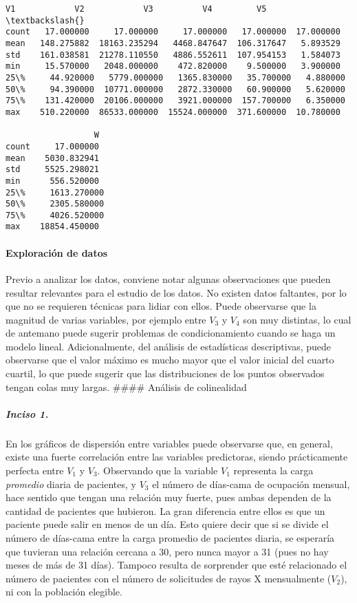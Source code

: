 \documentclass[11pt]{article}
\begin{document}
    
    
    \begin{Verbatim}[commandchars=\\\{\}]
               V1            V2            V3          V4         V5  \textbackslash{}
count   17.000000     17.000000     17.000000   17.000000  17.000000   
mean   148.275882  18163.235294   4468.847647  106.317647   5.893529   
std    161.038581  21278.110550   4886.552611  107.954153   1.584073   
min     15.570000   2048.000000    472.820000    9.500000   3.900000   
25\%     44.920000   5779.000000   1365.830000   35.700000   4.880000   
50\%     94.390000  10771.000000   2872.330000   60.900000   5.620000   
75\%    131.420000  20106.000000   3921.000000  157.700000   6.350000   
max    510.220000  86533.000000  15524.000000  371.600000  10.780000   

                  W  
count     17.000000  
mean    5030.832941  
std     5525.298021  
min      556.520000  
25\%     1613.270000  
50\%     2305.580000  
75\%     4026.520000  
max    18854.450000  
    \end{Verbatim}

    
    \hypertarget{exploraciuxf3n-de-datos}{%
\paragraph{Exploración de datos}\label{exploraciuxf3n-de-datos}}

Previo a analizar los datos, conviene notar algunas observaciones que
pueden resultar relevantes para el estudio de los datos. No existen
datos faltantes, por lo que no se requieren técnicas para lidiar con
ellos. Puede observarse que la magnitud de varias variables, por ejemplo
entre \(V_3\) y \(V_4\) son muy distintas, lo cual de antemano puede
sugerir problemas de condicionamiento cuando se haga un modelo lineal.
Adicionalmente, del análisis de estadísticas descriptivas, puede
observarse que el valor máximo es mucho mayor que el valor inicial del
cuarto cuartil, lo que puede sugerir que las distribuciones de los
puntos observados tengan colas muy largas. \#\#\#\# Análisis de
colinealidad

\hypertarget{inciso-1.}{%
\subparagraph{Inciso 1.}\label{inciso-1.}}

En los gráficos de dispersión entre variables puede observarse que, en
general, existe una fuerte correlación entre las variables predictoras,
siendo prácticamente perfecta entre \(V_1\) y \(V_3\). Observando que la
variable \(V_1\) representa la carga \emph{promedio} diaria de
pacientes, y \(V_3\) el número de días-cama de ocupación mensual, hace
sentido que tengan una relación muy fuerte, pues ambas dependen de la
cantidad de pacientes que hubieron. La gran diferencia entre ellos es
que un paciente puede salir en menos de un día. Esto quiere decir que si
se divide el número de días-cama entre la carga promedio de pacientes
diaria, se esperaría que tuvieran una relación cercana a 30, pero nunca
mayor a 31 (pues no hay meses de más de 31 días). Tampoco resulta de
sorprender que esté relacionado el número de pacientes con el número de
solicitudes de rayos X mensualmente (\(V_2\)), ni con la población
elegible.
\end{document}
